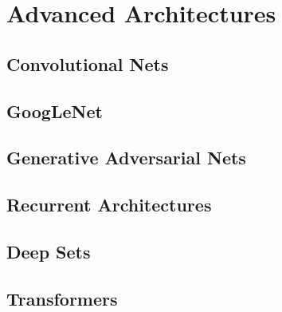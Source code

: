 \chapter{Advanced Architectures}

\section{Convolutional Nets}

\section{GoogLeNet}

\section{Generative Adversarial Nets}

\section{Recurrent Architectures}

\section{Deep Sets}

\section{Transformers}